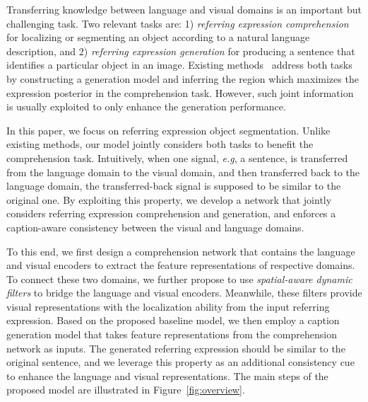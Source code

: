 \documentclass{bmvc2k}
\def\eg{\emph{e.g}\bmvaOneDot}
\begin{document}
Transferring knowledge between language and visual domains is an important but challenging task.
Two relevant tasks are: 1) {\em referring expression comprehension} for localizing or segmenting an object according to a natural language description, and 2) {\em referring expression generation} for producing a sentence that identifies a particular object in an image.
Existing methods~\cite{Mao_CVPR_2016,Yu_ECCV_2016} address both tasks by constructing a generation model and inferring the region which maximizes the expression posterior in the comprehension task. 
However, such joint information is usually exploited to only enhance the generation performance.





In this paper, we focus on referring expression object segmentation. 
Unlike existing methods, our model jointly considers both tasks to benefit the comprehension task. 
Intuitively, when one signal, \eg, a sentence, is transferred from the language domain to the visual domain, and then transferred back to the language domain, the transferred-back signal is supposed to be similar to the original one.
By exploiting this property, we develop a network that jointly considers referring expression comprehension and generation, and enforces a caption-aware consistency between the visual and language domains.






To this end, we first design a comprehension network that contains the language and visual encoders to extract the feature representations of respective domains.
To connect these two domains, we further propose to use {\em spatial-aware dynamic filters} to bridge the language and visual encoders.
Meanwhile, these filters provide visual representations with the localization ability from the input referring expression.
Based on the proposed baseline model, we then employ a caption generation model that takes feature representations from the comprehension network as inputs.
The generated referring expression should be similar to the original sentence, and we leverage this property as an additional consistency cue to enhance the language and visual representations.
The main steps of the proposed model are illustrated in Figure~\ref{fig:overview}.
\end{document}
